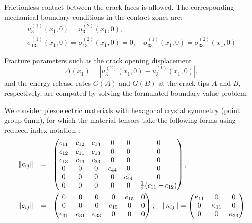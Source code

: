 Frictionless contact between the crack faces is allowed. The corresponding mechanical boundary conditions in the contact zones are:
\begin{equation}
\begin{array}{l}
    u_3^{(1)}(x_1, 0) = u_3^{(2)}(x_1, 0),
    \\
	\sigma_{13}^{(1)}(x_1, 0) = \sigma_{13}^{(2)}(x_1, 0) = 0, \quad
	\sigma_{33}^{(1)}(x_1, 0) = \sigma_{33}^{(2)}(x_1, 0)
\end{array}
	\label{AdluckyEq6}
\end{equation}

Fracture parameters such as the crack opening displacement
\[
\Delta(x_1) = \left| u_3^{(2)}(x_1, 0) - u_3^{(1)}(x_1, 0) \right|,
\]
and the energy release rates $G(A)$ and $G(B)$ at the crack tips $A$ and $B$, respectively, are computed by solving the formulated boundary value problem.

We consider piezoelectric materials with hexagonal crystal symmetry (point group 6mm), for which the material tensors take the following forms using reduced index notation \cite{Adlucky12}:
\begin{equation}
    \begin{array}{rcl}
        \|c_{ij}\| &=&
    \begin{pmatrix}
    	c_{11} & c_{12} & c_{13} & 0 & 0 & 0 \\
    	c_{12} & c_{11} & c_{13} & 0 & 0 & 0 \\
    	c_{13} & c_{13} & c_{33} & 0 & 0 & 0 \\
    	0 & 0 & 0 & c_{44} & 0 & 0 \\
    	0 & 0 & 0 & 0 & c_{44} & 0 \\
    	0 & 0 & 0 & 0 & 0 & \tfrac{1}{2}(c_{11} - c_{12})
    \end{pmatrix},
    \vspace{1ex}
    \\
	\|e_{ij}\| &=&
	\begin{pmatrix}
		0 & 0 & 0 & 0 & e_{15} & 0 \\
		0 & 0 & 0 & e_{15} & 0 & 0 \\
		e_{31} & e_{31} & e_{33} & 0 & 0 & 0
	\end{pmatrix}, \quad
	\|\kappa_{ij}\| =
	\begin{pmatrix}
		\kappa_{11} & 0 & 0 \\
		0 & \kappa_{11} & 0 \\
		0 & 0 & \kappa_{33}
	\end{pmatrix}
    \end{array}
	\label{AdluckyEq7}
\end{equation}

